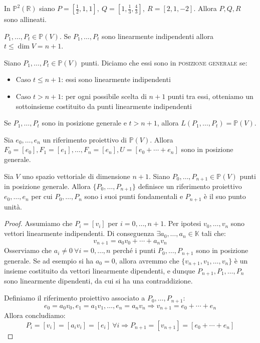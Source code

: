 \begin{ex}
In $\mathbb{P}^2(\mathbb{R})$ siano $P=[\frac{1}{2},1,1],\ Q=[1,\frac{1}{3},\frac{4}{3}],\ R=[2,1,-2]$. Allora $P,Q,R$ sono allineati.
\end{ex}

\begin{oss}
$P_1,\dots,P_t \in \mathbb{P}(V)$. Se $P_1,\dots,P_t$ sono linearmente indipendenti allora $t \le \dim V=n+1$.
\end{oss}

\begin{defn}
Siano $P_1,\dots,P_t \in \mathbb{P}(V)$ punti. Diciamo che essi sono in \textsc{posizione generale} se:
\begin{itemize}
	\item Caso $t \le n+1$: essi sono linearmente indipendenti
	\item Caso $t>n+1$: per ogni possibile scelta di $n+1$ punti tra essi, otteniamo un sottoinsieme costituito da punti linearmente 		indipendenti
\end{itemize}
\end{defn}

\begin{oss}
Se $P_1,\dots,P_t$ sono in posizione generale e $t>n+1$, allora $L(P_1,\dots,P_t)=\mathbb{P}(V)$.
\end{oss}

\begin{ex}
Sia $e_0,\dots,e_n$ un riferimento proiettivo di $\mathbb{P}(V)$. Allora $F_0=[e_0],F_1=[e_1],\dots,F_n=[e_n],U=[e_0+\cdots+e_n]$ sono in posizione generale.
\end{ex}

\begin{lm}
Sia $V$ uno spazio vettoriale di dimensione $n+1$. Siano $P_0,\dots,P_{n+1} \in \mathbb{P}(V)$ punti in posizione generale. Allora $\{P_0,\dots,P_{n+1}\}$ definisce un riferimento proiettivo $e_0,\dots,e_n$ per cui $P_0,\dots,P_n$ sono i suoi punti fondamentali e $P_{n+1}$ è il suo punto unità.
\end{lm}

\begin{proof}
Assumiamo che $P_i=[v_i]$ per $i=0,\dots,n+1$. Per ipotesi $v_0,\dots,v_n$ sono vettori linearmente indipendenti. Di conseguenza $\exists a_0,\dots,a_n \in \mathbb{K}$ tali che:
$$v_{n+1}=a_0v_0+\cdots+a_nv_n$$
Osserviamo che $a_i \neq 0\ \forall i=0,\dots,n$ perché i punti $P_0,\dots,P_{n+1}$ sono in posizione generale. Se ad esempio si ha $a_0=0$, allora avremmo che $\{v_{n+1},v_1,\dots,v_n\}$ è un insieme costituito da vettori linearmente dipendenti, e dunque $P_{n+1},P_1,\dots,P_n$ sono linearmente dipendenti, da cui si ha una contraddizione.

Definiamo il riferimento proiettivo associato a $P_0,\dots,P_{n+1}$:
$$e_0=a_0v_0, e_1=a_1v_1,\dots,e_n=a_nv_n \Rightarrow v_{n+1}=e_0+\cdots+e_n$$
Allora concludiamo:
$$P_i=[v_i]=[a_iv_i]=[e_i]\ \forall i \Rightarrow P_{n+1}=[v_{n+1}]=[e_0+\cdots+e_n]$$
\end{proof}


